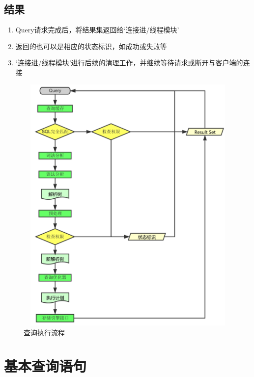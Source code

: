 \documentclass[UTF8,a4paper,12pt]{ctexbook}
\begin{document}
		\subsection{结果}
			\begin{enumerate}
				\item Query请求完成后，将结果集返回给‘连接进/线程模块’
				\item 返回的也可以是相应的状态标识，如成功或失败等
				\item ‘连接进/线程模块’进行后续的清理工作，并继续等待请求或断开与客户端的连接
			\end{enumerate}
			
			\begin{figure}[H]
				\centering
				\includegraphics[width=17cm,height=13cm]{mysqlProcess}
				\caption{查询执行流程}
			\end{figure}
			
	\section{基本查询语句}
\end{document}
